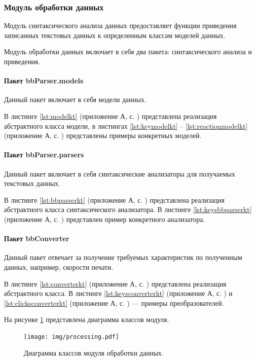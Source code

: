 \subsubsection{Модуль обработки данных}
Модуль синтаксического анализа данных предоставляет функции приведения записанных текстовых данных к определенным классам моделей данных.

Модуль обработки данных включает в себя два пакета: синтаксического анализа и приведения.

\paragraph{Пакет bbParser.models \newline}
Данный пакет включает в себя модели данных.

В листинге \ref{lst:modelkt} (приложение А, с. \pageref{chp:application-a}) представлена реализация абстрактного класса модели, в листингах \ref{lst:keymodelkt} -- \ref{lst:reactionmodelkt} (приложение А, с. \pageref{chp:application-a}) представлены примеры конкретных моделей.

\paragraph{Пакет bbParser.parsers \newline}
Данный пакет включает в себя синтаксические анализаторы для получаемых текстовых данных.

В листинге \ref{lst:bbparserkt} (приложение А, с. \pageref{chp:application-a}) представлена реализация абстрактного класса синтаксического анализатора. В листинге \ref{lst:keysbbparserkt} (приложение А, с. \pageref{chp:application-a}) представлен пример конкретного анализатора.

\paragraph{Пакет bbConverter \newline}
Данный пакет отвечает за получение требуемых характеристик по полученным данных, например, скорости печати.

В листинге \ref{lst:converterkt} (приложение А, с. \pageref{chp:application-a}) представлена реализация абстрактного класса. В листинге \ref{lst:keysconverterkt} (приложение А, с. \pageref{chp:application-a}) и \ref{lst:clicksconverterkt} (приложение А, с. \pageref{chp:application-a}) --- примеры преобразователей.

На рисунке \ref{fig:processingUml} представлена диаграмма классов модуля.
\begin{figure}
	\centering
	\texttt{[image: img/processing.pdf]}
	\caption{Диаграмма классов модуля обработки данных.}
	\label{fig:processingUml}
\end{figure}

